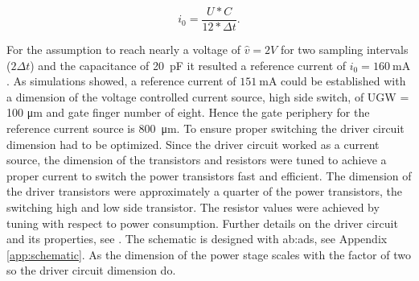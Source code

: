\begin{equation}
i_0 = \frac{U*C}{12*\Delta t}.
\end{equation}

For the assumption to reach nearly a voltage of $\hat{v} = 2V$ for two sampling intervals ($2 \Delta t$) and the capacitance of \SI{20}{\pico \farad} it resulted a reference current of $i_0 = \SI{160}{\milli \ampere}$.
As simulations showed, a reference current of $\SI{151}{\milli \ampere}$ could be established with a dimension of the voltage controlled current source, high side switch, of UGW = 100 \si{\micro \meter} and gate finger number of eight.
Hence the gate periphery for the reference current source is \SI{800}{\micro \meter}.
To ensure proper switching the driver circuit dimension had to be optimized.
Since the driver circuit worked as a current source, the dimension of the transistors and resistors were tuned to achieve a proper current to switch the power transistors fast and efficient.
The dimension of the driver transistors were approximately a quarter of the power transistors, the switching high and low side transistor.
The resistor values were achieved by tuning with respect to power consumption.
Further details on the driver circuit and its properties, see \cite{MaksimovicPaper}.
The schematic is designed with \gls{ab:ads}, see Appendix \ref{app:schematic}.
As the dimension of the power stage scales with the factor of two so the driver circuit dimension do.


